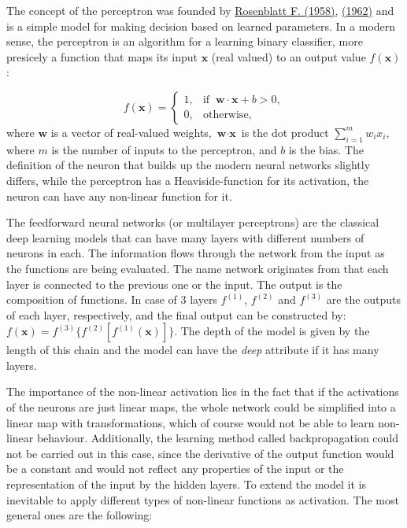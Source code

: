 \documentclass[12pt]{article}
\theoremstyle{plain}
\begin{document}
The concept of the perceptron was founded by \hyperlink{Deeplea_Rosenblatt_1}{Rosenblatt F. (1958),} \hyperlink{Deeplea_Rosenblatt_2}{(1962)} and is a simple model for making decision based on learned parameters. In a modern sense, the perceptron is an algorithm for a learning binary classifier, more presicely a function that maps its input $\textbf{x}$ (real valued) to an output value $f(\textbf{x})$:

\begin{equation}
f(\mathbf{x}) = \begin{cases}1, & \text{if }\ \mathbf{w} \cdot \mathbf{x} + b > 0,\\0, & \text{otherwise,}\end{cases}
\end{equation}
where $\textbf{w}$ is a vector of real-valued weights, $\textbf{w} \cdot \textbf{x}$ is the dot product $\sum_{i=1}^m w_i x_i$, where $m$ is the number of inputs to the perceptron, and $b$ is the bias. The definition of the neuron that builds up the modern neural networks slightly differs, while the perceptron has a Heaviside-function for its activation, the neuron can have any non-linear function for it.

The feedforward neural networks (or multilayer perceptrons) are the classical deep learning models that can have many layers with different numbers of neurons in each. The information flows through the network from the input as the functions are being evaluated. The name network originates from that each layer is connected to the previous one or the input. The output is the composition of functions. In case of 3 layers $f^{(1)}$, $f^{(2)}$ and $f^{(3)}$ are the outputs of each layer, respectively, and the final output can be constructed by: $f(\textbf{x}) =  f^{(3)}\{f^{(2)}[f^{(1)}(\textbf{x})]\}$. The depth of the model is given by the length of this chain and the model can have the \textit{deep} attribute if it has many layers.

The importance of the non-linear activation lies in the fact that if the activations of the neurons are just linear maps, the whole network could be simplified into a linear map with transformations, which of course would not be able to learn non-linear behaviour. Additionally, the learning method called backpropagation could not be carried out in this case, since the derivative of the output function would be a constant and would not reflect any properties of the input or the representation of the input by the hidden layers. To extend the model it is inevitable to apply different types of non-linear functions as activation. The most general ones are the following:
\end{document}
